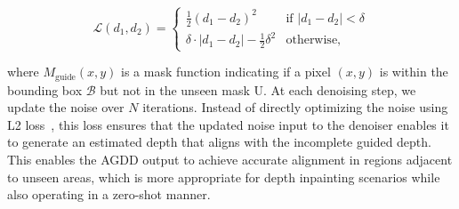\begin{small}
\begin{equation}
\mathcal{L}(d_1, d_2) = 
\begin{cases} 
\frac{1}{2} (d_1 - d_2)^2 & \text{if } |d_1 - d_2| < \delta \\
\delta \cdot |d_1 - d_2| - \frac{1}{2} \delta^2 & \text{otherwise,}
\end{cases}
\end{equation}
\end{small}
where $M_{\text{guide}}(x, y)$ is a mask function indicating if a pixel $(x, y)$ is within the bounding box $\mathcal{B}$ but not in the unseen mask U. At each denoising step, we update the noise over $N$ iterations. Instead of directly optimizing the noise using L2 loss~\cite{yu2024wonderworld}, this loss ensures that the updated noise input to the denoiser enables it to generate an estimated depth that aligns with the incomplete guided depth. This enables the AGDD output to achieve accurate alignment in regions adjacent to unseen areas, which is more appropriate for depth inpainting scenarios while also operating in a zero-shot manner.


